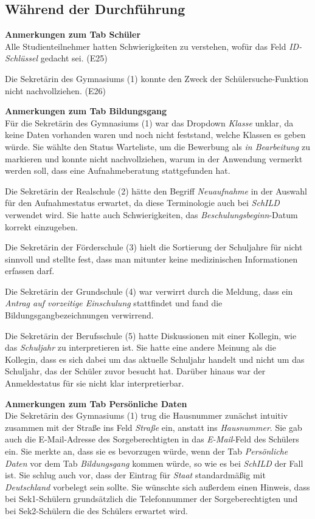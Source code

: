 \subsection{Während der Durchführung}

\textbf{Anmerkungen zum Tab \glqq Schüler\grqq{}}\\  
Alle Studienteilnehmer hatten Schwierigkeiten zu verstehen, wofür das Feld \textit{ID-Schlüssel} gedacht sei. (E25)

Die Sekretärin des Gymnasiums (1) konnte den Zweck der Schülersuche-Funktion nicht nachvollziehen. (E26)


\textbf{Anmerkungen zum Tab \glqq Bildungsgang\grqq{}}\\
Für die Sekretärin des Gymnasiums (1) war das Dropdown \textit{Klasse} unklar, da keine Daten vorhanden waren und noch nicht feststand, welche Klassen es geben würde. Sie wählte den Status \glqq Warteliste\grqq{}, um die Bewerbung als \textit{in Bearbeitung} zu markieren und konnte nicht nachvollziehen, warum in der Anwendung vermerkt werden soll, dass eine Aufnahmeberatung stattgefunden hat.

Die Sekretärin der Realschule (2) hätte den Begriff \textit{Neuaufnahme} in der Auswahl für den Aufnahmestatus erwartet, da diese Terminologie auch bei \textit{SchILD} verwendet wird. Sie hatte auch Schwierigkeiten, das \textit{Beschulungsbeginn}-Datum korrekt einzugeben.

Die Sekretärin der Förderschule (3) hielt die Sortierung der Schuljahre für nicht sinnvoll und stellte fest, dass man mitunter keine medizinischen Informationen erfassen darf.

Die Sekretärin der Grundschule (4) war verwirrt durch die Meldung, dass ein \textit{Antrag auf vorzeitige Einschulung} stattfindet und fand die Bildungsgangbezeichnungen verwirrend.

Die Sekretärin der Berufsschule (5) hatte Diskussionen mit einer Kollegin, wie das \textit{Schuljahr} zu interpretieren ist. Sie hatte eine andere Meinung als die Kollegin, dass es sich dabei um das aktuelle Schuljahr handelt und nicht um das Schuljahr, das der Schüler zuvor besucht hat. Darüber hinaus war der Anmeldestatus für sie nicht klar interpretierbar.

\textbf{Anmerkungen zum Tab \glqq Persönliche Daten\grqq{}}\\
Die Sekretärin des Gymnasiums (1) trug die Hausnummer zunächst intuitiv zusammen mit der Straße ins Feld \textit{Straße} ein, anstatt ins \textit{Hausnummer}. Sie gab auch die E-Mail-Adresse des Sorgeberechtigten in das \textit{E-Mail}-Feld des Schülers ein. Sie merkte an, dass sie es bevorzugen würde, wenn der Tab \textit{Persönliche Daten} vor dem Tab \textit{Bildungsgang} kommen würde, so wie es bei \textit{SchILD}  der Fall ist. Sie schlug auch vor, dass der Eintrag für \textit{Staat} standardmäßig mit \textit{Deutschland} vorbelegt sein sollte. Sie wünschte sich außerdem einen Hinweis, dass bei Sek1-Schülern grundsätzlich die Telefonnummer der Sorgeberechtigten und bei Sek2-Schülern die des Schülers erwartet wird.

